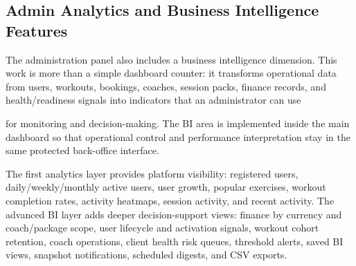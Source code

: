 \documentclass[12pt,a4paper,openany]{report}
\begin{document}
\subsection{Admin Analytics and Business Intelligence Features}

The administration panel also includes a business intelligence dimension. This work is more than a simple dashboard counter: it transforms operational data from users, workouts, bookings, coaches, session packs, finance records, and health/readiness signals into indicators that an administrator can use


for monitoring and decision-making. The BI area is implemented inside the main dashboard so that operational control and performance interpretation stay in the same protected back-office interface.


The first analytics layer provides platform visibility: registered users, daily/weekly/monthly active users, user growth, popular exercises, workout completion rates, activity heatmaps, session activity, and recent activity. The advanced BI layer adds deeper decision-support views: finance by currency and coach/package scope, user lifecycle and activation signals, workout cohort retention, coach operations, client health risk queues, threshold alerts, saved BI views, snapshot notifications, scheduled digests, and CSV exports.
\end{document}
